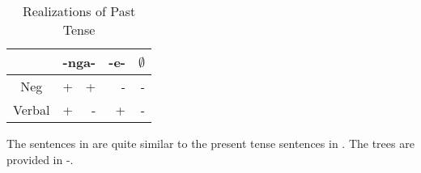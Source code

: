 \documentclass[output=paper]{langsci/langscibook}
\begin{document}
\begin{table}
\caption{Realizations of Past Tense} %
\centering %
\begin{tabular}{c| rr|r|r} %
\midrule%
 &\multicolumn{2}{c}{-nga-}& \multicolumn{1}{|c}{-e-}& \multicolumn{1}{|c}{$\emptyset$} \\ [0.5ex] 
\midrule%
Neg & + & + & - & -\\ %
Verbal & + & - & +& -\\[1ex] %
\midrule%
\end{tabular} 
\label{tab:burkholder:4}
\end{table} 


The sentences in  are quite similar to the present tense sentences in . The trees are provided in -.




\begin{exe}
\ex\label{ex:burkholder:10}
\end{exe}
% 
% 
% 
\end{document}
